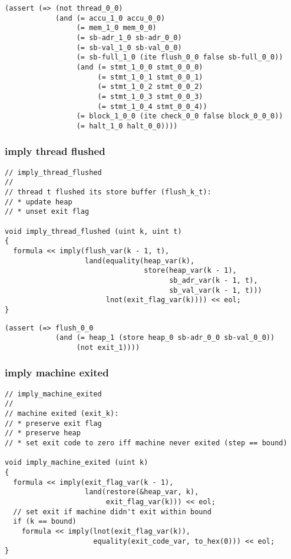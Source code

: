 \begin{lstlisting}[language=SMTLib]
(assert (=> (not thread_0_0)
            (and (= accu_1_0 accu_0_0)
                 (= mem_1_0 mem_0_0)
                 (= sb-adr_1_0 sb-adr_0_0)
                 (= sb-val_1_0 sb-val_0_0)
                 (= sb-full_1_0 (ite flush_0_0 false sb-full_0_0))
                 (and (= stmt_1_0_0 stmt_0_0_0)
                      (= stmt_1_0_1 stmt_0_0_1)
                      (= stmt_1_0_2 stmt_0_0_2)
                      (= stmt_1_0_3 stmt_0_0_3)
                      (= stmt_1_0_4 stmt_0_0_4))
                 (= block_1_0_0 (ite check_0_0 false block_0_0_0))
                 (= halt_1_0 halt_0_0))))
\end{lstlisting}

\subsubsection{imply thread flushed}

\begin{lstlisting}[style=c++]
// imply_thread_flushed
//
// thread t flushed its store buffer (flush_k_t):
// * update heap
// * unset exit flag

void imply_thread_flushed (uint k, uint t)
{
  formula << imply(flush_var(k - 1, t),
                   land(equality(heap_var(k),
                                 store(heap_var(k - 1),
                                       sb_adr_var(k - 1, t),
                                       sb_val_var(k - 1, t)))
                        lnot(exit_flag_var(k)))) << eol;
}
\end{lstlisting}

\begin{lstlisting}[language=SMTLib]
(assert (=> flush_0_0
            (and (= heap_1 (store heap_0 sb-adr_0_0 sb-val_0_0))
                 (not exit_1))))
\end{lstlisting}

\subsubsection{imply machine exited}

\begin{lstlisting}[style=c++]
// imply_machine_exited
//
// machine exited (exit_k):
// * preserve exit flag
// * preserve heap
// * set exit code to zero iff machine never exited (step == bound)

void imply_machine_exited (uint k)
{
  formula << imply(exit_flag_var(k - 1),
                   land(restore(&heap_var, k),
                        exit_flag_var(k))) << eol;
  // set exit if machine didn't exit within bound
  if (k == bound)
    formula << imply(lnot(exit_flag_var(k)),
                     equality(exit_code_var, to_hex(0))) << eol;
}
\end{lstlisting}

